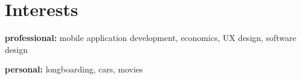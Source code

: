 \documentclass[]{friggeri-cv} %
\begin{document}

\section{Interests}

\textbf{professional:} mobile application development, economics, UX design, software design

\textbf{personal:} longboarding, cars, movies
\end{document}

